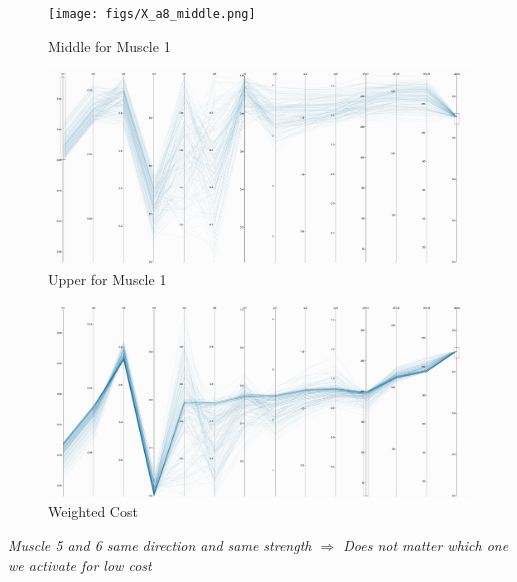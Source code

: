 \begin{figure}[ht]
   \begin{center}
    \texttt{[image: figs/X\_a8\_middle.png]}
  \end{center}
  \caption{Middle for Muscle 1}
  \label{fig_mid}
\end{figure}

\begin{figure}[ht]
   \begin{center}
    \includegraphics[width=1.0\textwidth]{figs/X_a8_upper.png}
  \end{center}
  \caption{Upper for Muscle 1}
  \label{fig_high}
\end{figure}

\begin{figure}[ht]
   \begin{center}
    \includegraphics[width=1.0\textwidth]{figs/X_a8_weightedcost.png}
  \end{center}
  \caption{Weighted Cost}
  \label{fig_cost}
\end{figure}

\textit{Muscle 5 and 6 same direction and same strength $\Rightarrow$ Does not matter which one we activate for low cost}